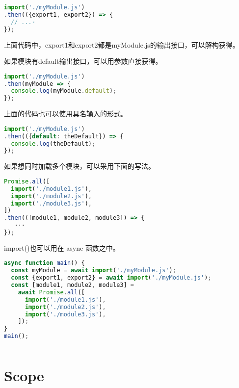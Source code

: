 \begin{lstlisting}[language=JavaScript]
import('./myModule.js')
.then(({export1, export2}) => {
  // ...·
});
\end{lstlisting}

上面代码中，export1和export2都是myModule.js的输出接口，可以解构获得。

如果模块有default输出接口，可以用参数直接获得。


\begin{lstlisting}[language=JavaScript]
import('./myModule.js')
.then(myModule => {
  console.log(myModule.default);
});
\end{lstlisting}

上面的代码也可以使用具名输入的形式。





\begin{lstlisting}[language=JavaScript]
import('./myModule.js')
.then(({default: theDefault}) => {
  console.log(theDefault);
});
\end{lstlisting}


如果想同时加载多个模块，可以采用下面的写法。

\begin{lstlisting}[language=JavaScript]
Promise.all([
  import('./module1.js'),
  import('./module2.js'),
  import('./module3.js'),
])
.then(([module1, module2, module3]) => {
   ···
});
\end{lstlisting}


import()也可以用在 async 函数之中。



\begin{lstlisting}[language=JavaScript]
async function main() {
  const myModule = await import('./myModule.js');
  const {export1, export2} = await import('./myModule.js');
  const [module1, module2, module3] =
    await Promise.all([
      import('./module1.js'),
      import('./module2.js'),
      import('./module3.js'),
    ]);
}
main();
\end{lstlisting}






\begin{lstlisting}[language=JavaScript]

\end{lstlisting}


\chapter{Scope}

